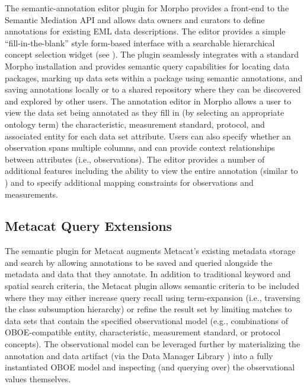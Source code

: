 The semantic-annotation editor plugin for Morpho provides a front-end
to the Semantic Mediation API and allows data owners and curators to
define annotations for existing EML data descriptions. The editor
provides a simple ``fill-in-the-blank'' style form-based interface
with a searchable hierarchical concept selection widget (see
). The plugin seamlessly integrates with
a standard Morpho installation and provides semantic query
capabilities for locating data packages, marking up data sets within a
package using semantic annotations, and saving annotations locally or
to a shared repository where they can be discovered and explored by
other users. The annotation editor in Morpho allows a user to view the
data set being annotated as they fill in (by selecting an appropriate
ontology term) the characteristic, measurement standard, protocol, and
associated entity for each data set attribute. Users can also specify
whether an observation spans multiple columns, and can provide context
relationships between attributes (i.e., observations). The editor
provides a number of additional features including the ability to view
the entire annotation (similar to ) and to
specify additional mapping constraints for observations and
measurements.

\subsection{Metacat Query Extensions}  

The semantic plugin for Metacat augments Metacat's existing metadata
storage and search by allowing annotations to be saved and queried
alongside the metadata and data that they annotate. In addition to
traditional keyword and spatial search criteria, the Metacat plugin
allows semantic criteria to be included where they may either increase
query recall using term-expansion (i.e., traversing the class
subsumption hierarchy) or refine the result set by limiting matches to
data sets that contain the specified observational model (e.g.,
combinations of OBOE-compatible entity, characteristic, measurement
standard, or protocol concepts). The observational model can be
leveraged further by materializing the annotation and data artifact
(via the Data Manager Library
\cite{leinfelder10:_metad_driven_approac_to_loadin}) into a fully
instantiated OBOE model and inspecting (and querying over) the
observational values themselves.

